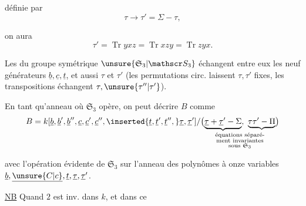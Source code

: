 définie par
\[
 \tau\longrightarrow\tau'=\Sigma-\tau,
\]

on aura
\[
 \tau'=\operatorname{Tr}yxz=\operatorname{Tr}xzy=\operatorname{Tr}zyx.
\]

Les  du groupe symétrique $\unsure{\mathfrak S_3|\mathscr S_3}$ échangent entre eux les neuf générateurs $\underline b,\underline c,\underline t$, et aussi $\tau$ et $\tau'$ (les permutations circ. laissent $\tau,\tau'$ fixes, les transpositions échangent $\tau,\unsure{\tau''|\tau'}$).

En  tant qu'anneau où $\mathfrak S_3$ opère, on peut décrire $B$ comme
\[
 B=k[\underline b,\underline b',\underline b'',\underline c,\underline c',\underline c'',\inserted{\underline t,\underline t',\underline t'',}\underline\tau,\underline\tau']/
 \bigl(\underset{\substack{\text{équations séparé-}\\\text{ment invariantes}\\\text{sous }\mathfrak S_3}}{\underbrace{\underline\tau+\underline\tau'-\Sigma},\ \underbrace{\tau\tau'-\Pi}}\bigr)
\]

avec l'opération évidente de $\mathfrak S_3$ sur l'anneau des polynômes à onze variables $\underline b,\underline{\unsure{C|c}},\underline t,\underline\tau,\underline\tau'$.

\uline{NB} Quand $2$ est inv. dans $k$, et dans ce
